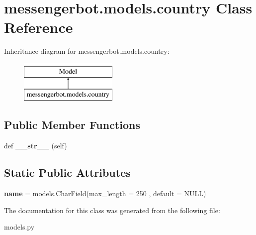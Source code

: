 \hypertarget{classmessengerbot_1_1models_1_1country}{}\section{messengerbot.\+models.\+country Class Reference}
\label{classmessengerbot_1_1models_1_1country}
Inheritance diagram for messengerbot.\+models.\+country\+:\begin{figure}[H]
\begin{center}
\leavevmode
\includegraphics[height=2.000000cm]{classmessengerbot_1_1models_1_1country}
\end{center}
\end{figure}
\subsection*{Public Member Functions}
\begin{DoxyCompactItemize}
\item 
\mbox{\label{classmessengerbot_1_1models_1_1country_a87a737d0996b7e070945370c72839e30}} 
def {\bfseries \+\_\+\+\_\+str\+\_\+\+\_\+} (self)
\end{DoxyCompactItemize}
\subsection*{Static Public Attributes}
\begin{DoxyCompactItemize}
\item 
\mbox{\label{classmessengerbot_1_1models_1_1country_af2e57cfffa2944ef3adbd02f53146fcc}} 
{\bfseries name} = models.\+Char\+Field(max\+\_\+length = 250 , default = \textquotesingle{}N\+U\+LL\textquotesingle{})
\end{DoxyCompactItemize}


The documentation for this class was generated from the following file\+:\begin{DoxyCompactItemize}
\item 
models.\+py\end{DoxyCompactItemize}
